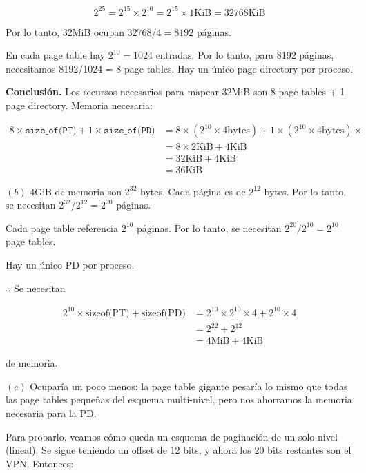 \documentclass[12pt]{article}
\theoremstyle{definition}
\begin{document}
\begin{equation*}
    2^{25} = 2^{15} \times 2^{10} = 2^{15} \times 1\text{KiB} = 32768\text{KiB}
\end{equation*}

Por lo tanto, 32MiB ocupan $32768 / 4 = 8192$ páginas. 

En cada page table hay $2^{10} = 1024$ entradas. Por lo tanto, para 8192
páginas, necesitamos 8192/1024 = 8 page tables. Hay un único page directory por
proceso.

\textbf{Conclusión.} Los recursos necesarios para mapear 32MiB son 8 page tables
+ 1 page directory. Memoria necesaria:

\texttt{}
\begin{align*}
    8 \times \texttt{size\_of(PT)} + 1 \times \texttt{size\_of(PD)} 
    &= 8 \times ( 2^{10} \times 4 \text{bytes} ) + 1
    \times (2^{10} \times 4\text{bytes}) \times
     \\ 
    &= 8 \times 2\text{KiB} + 4\text{KiB} \\ 
    &= 32\text{KiB} + 4\text{KiB} \\ 
    &= 36\text{KiB}
\end{align*}

$(b)$ 4GiB de memoria son $2^{32}$ bytes. Cada página es de $2^{12}$ bytes. Por
lo tanto, se necesitan $2^{32} / 2^{12} = 2^{20}$ páginas. 

Cada page table referencia $2^{10}$ páginas. Por lo tanto, se necesitan $2^{20}
/ 2^{10} = 2^{10}$ page tables.

Hay un único PD por proceso.

$\therefore $ Se necesitan 

\begin{align*}
    2^{10} \times \text{sizeof(PT)} + \text{sizeof(PD)} 
    &=2^{10} \times 2^{10} \times 4 + 2^{10} \times 4 \\ 
    &= 2^{22} + 2^{12} \\ 
    &=4\text{MiB} + 4\text{KiB}
\end{align*}

de memoria.

$(c)$ Ocuparía un poco menos: la page table gigante pesaría lo mismo que todas
las page tables pequeñas del esquema multi-nivel, pero nos ahorramos la memoria
necesaria para la PD. 

Para probarlo, veamos cómo queda un esquema de paginación de un solo nivel
(lineal). Se sigue teniendo un offset de 12 bits, y ahora los 20 bits restantes
son el VPN. Entonces:
\end{document}

